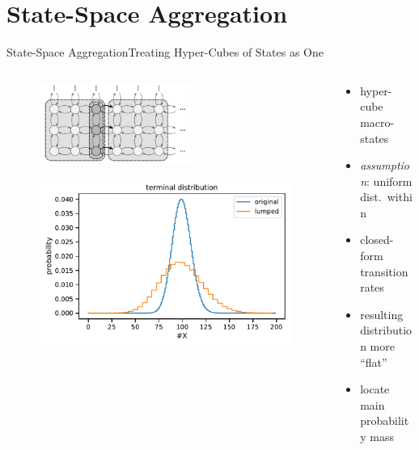 \documentclass{beamer}
\begin{document}
\section{State-Space Aggregation}
\begin{frame}{State-Space Aggregation}{Treating Hyper-Cubes of States as One \parencite{backenkohler2020analysis,backenkohler2021abstraction}}
    \begin{columns}
        \begin{column}{.4\textwidth}
            \begin{figure}
            \includegraphics[width=5cm]{../gfx/macro_states.pdf}
            \end{figure}
            \begin{figure}
                \includegraphics[scale=.3]{../gfx/lumped_dist.pdf}
            \end{figure}
        \end{column}
        \begin{column}{.6\textwidth}
            \begin{itemize}
                \item hyper-cube macro-states
                \item \emph{assumption}: uniform dist.\ within
                \item closed-form transition rates
            \end{itemize}
            \vspace{17mm}
            \begin{itemize}
                \item resulting distribution more ``flat''
                \item locate main probability mass
            \end{itemize}
            \vspace{4mm}
        \end{column}
    \end{columns}
\end{frame}
\end{document}
